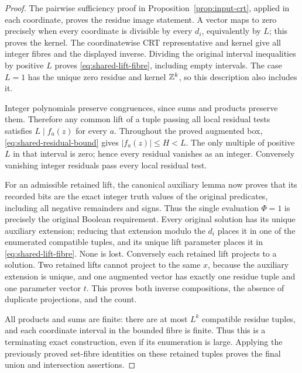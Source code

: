 \begin{proof}
The pairwise sufficiency proof in
Proposition~\ref{prop:input-crt}, applied in each coordinate,
proves the residue image statement.  A vector maps to zero
precisely when every coordinate is divisible by every \(d_i\),
equivalently by \(L\); this proves the kernel.
The coordinatewise CRT representative and kernel give all
integer fibres and the displayed inverse.  Dividing the
original interval inequalities by positive \(L\) proves
\eqref{eq:shared-lift-fibre}, including empty intervals.
The case \(L=1\) has the unique zero residue and
kernel \(\mathbb Z^k\), so this description also includes it.

Integer polynomials preserve congruences, since sums and
products preserve them.  Therefore any common lift of a
tuple passing all local residual tests satisfies
\(L\mid f_a(z)\) for every \(a\).
Throughout the proved augmented box,
\eqref{eq:shared-residual-bound} gives
\(|f_a(z)|\le H<L\).  The only multiple of positive
\(L\) in that interval is zero; hence every residual
vanishes as an integer.  Conversely vanishing integer
residuals pass every local residual test.

For an admissible retained lift, the canonical auxiliary
lemma now proves that its recorded bits are the exact
integer truth values of the original predicates, including
all negative remainders and signs.  Thus the single
evaluation \(\Phi=1\) is precisely the original Boolean
requirement.  Every original solution has its unique
auxiliary extension; reducing that extension modulo the
\(d_i\) places it in one of the enumerated compatible
tuples, and its unique lift parameter places it in
\eqref{eq:shared-lift-fibre}.  None is lost.
Conversely each retained lift projects to a solution.
Two retained lifts cannot project to the same \(x\),
because the auxiliary extension is unique, and one
augmented vector has exactly one residue tuple and one
parameter vector \(t\).  This proves both inverse
compositions, the absence of duplicate projections,
and the count.

All products and sums are finite: there are at most
\(L^k\) compatible residue tuples, and each coordinate
interval in the bounded fibre is finite.
Thus this is a terminating exact construction, even if
its enumeration is large.  Applying the previously proved
set-fibre identities on these retained tuples proves
the final union and intersection assertions.
\end{proof}

